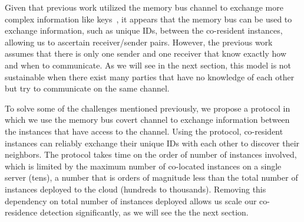 Given that previous work utilized the memory bus channel to exchange more
complex information like keys~\cite{wuusenix2012}, it appears that the memory
bus can be used to exchange information, such as unique IDs, between the
co-resident instances, allowing us to ascertain receiver/sender pairs.  However,
the previous work assumes that there is only one sender and one receiver that
know exactly how and when to communicate. As we will see in the next section,
this model is not sustainable when there exist many parties that have no
knowledge of each other but try to communicate on the same channel.

To solve some of the challenges mentioned previously, we propose a protocol in
which we use the memory bus covert channel to exchange information between the
instances that have access to the channel. Using the protocol, co-resident
instances can reliably exchange their unique IDs with each other to discover
their neighbors. The protocol takes time on the order of number of instances
involved, which is limited by the maximum number of co-located instances on a
single server (tens), a number that is orders of magnitude less than the total
number of instances deployed to the cloud (hundreds to thousands). Removing this
dependency on total number of instances deployed allows us scale our co-residence
detection significantly, as we will see the the next section.
